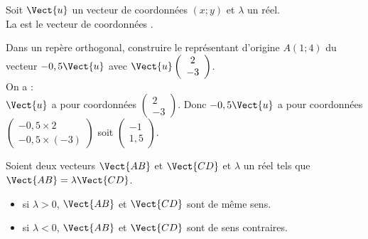 \documentclass{book}
\begin{document}
\begin{Definition}
Soit $\Vect{u}$ un vecteur de coordonnées $(x;y)$ et $\lambda$ un réel. \\
La  est le vecteur  de coordonnées .
\end{Definition}

\begin{Methode}
 Dans un repère orthogonal, construire le représentant d'origine $A(1; 4)$ du vecteur $-0,5 \Vect{u}$ avec $\Vect{u} \left( \begin{array}{c} 2 \\-3\end{array}\right)$.\\
 On a :\\
$\Vect{u}$ a pour coordonnées $\left( \begin{array}{c} 2 \\-3\end{array}\right)$. 
Donc $-0,5 \Vect{u}$ a pour coordonnées $\left( \begin{array}{c} -0,5\times 2 \\-0,5\times (-3)\end{array}\right)$  
soit $\left( \begin{array}{c} -1 \\1,5\end{array}\right)$. 
\begin{center}
\end{center}
\end{Methode}

\begin{Proposition}
Soient deux vecteurs $\Vect{AB}$ et $\Vect{CD}$ et $\lambda$ un réel tels que  $\Vect{AB}=\lambda\Vect{CD}$. 
\begin{itemize}
 \item si $\lambda>0$, $\Vect{AB}$ et $\Vect{CD}$ sont de même sens.
\item si $\lambda<0$, $\Vect{AB}$ et $\Vect{CD}$ sont de sens contraires.
\end{itemize}
\end{Proposition}
\end{document}
